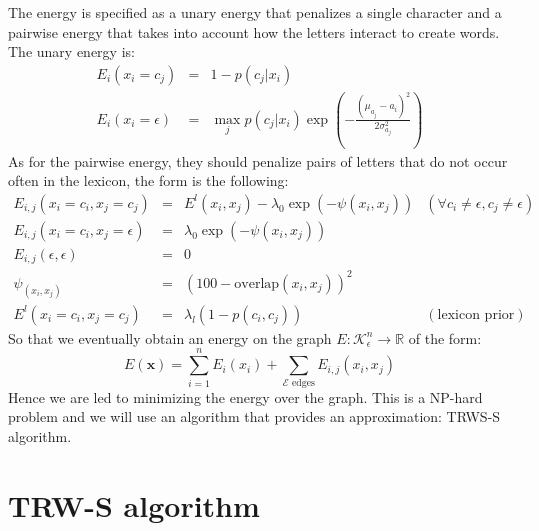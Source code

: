 \documentclass[10pt,a4paper]{article}
\begin{document}
The energy is specified as a unary energy that penalizes a single character and a pairwise energy that takes into account how the letters interact to create words. The unary energy is: 
\begin{equation}
\begin{array}{rll}
E_i(x_i = c_j) & = & \displaystyle 1 - p(c_j|x_i) \\
E_i(x_i = \epsilon)	& = & \displaystyle \max_j p(c_j |x_i) \exp\left( - \frac{(\mu_{a_j} - a_i)^2}{2\sigma^2_{a_j}} \right)
\end{array}
\label{eq:}
\end{equation}
As for the pairwise energy, they should penalize pairs of letters that do not occur often in the lexicon, the form is the following:
\begin{equation}
\begin{array}{rlll}
E_{i,j}(x_i = c_i,x_j = c_j) 			& = & \displaystyle E^l(x_i,x_j) - \lambda_0\exp\left( - \psi(x_i,x_j) \right) 	& (\forall c_i \neq \epsilon, c_j \neq \epsilon) \\
E_{i,j}(x_i = c_i,x_j = \epsilon) & = & \displaystyle \lambda_0\exp\left( - \psi(x_i,x_j) \right) 								& \\
E_{i,j}(\epsilon, \epsilon) 			& = & \displaystyle 0 																													& \\
\psi_(x_i,x_j) 										& = & \displaystyle (100 - \text{overlap}(x_i,x_j))^2 													& \\
E^l(x_i = c_i,x_j = c_j)					& = & \displaystyle \lambda_l(1 - p(c_i,c_j)) 																	& (\text{lexicon prior})
\end{array}
\label{eq:pairwiseEnergy}
\end{equation}
So that we eventually obtain an energy on the graph $E:\mathcal{K}_{\epsilon}^n \rightarrow \mathbb{R}$ of the form:
\begin{equation}
E(\mathbf{x})	= \sum_{i=1}^n E_i(x_i) + \sum_{\mathcal{E} \text{ edges}} E_{i,j}(x_i,x_j)
\label{eq:}
\end{equation}
Hence we are led to minimizing the energy over the graph. This is a NP-hard problem and we will use an algorithm that provides an approximation: TRWS-S algorithm. 









\section{TRW-S algorithm}
\end{document}
